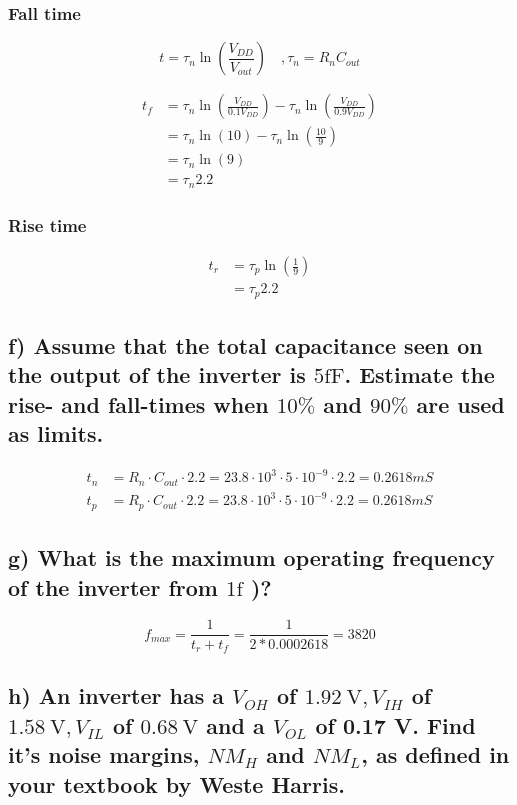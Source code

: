 \subsubsection*{Fall time}
$$t=\tau_n \ln \left(\frac{V_{DD}}{V_{out}}\right)\quad ,\tau_n=R_nC_{out}$$

$$\begin{aligned}
    t_f&=\tau_n \ln \left(\frac{V_{DD}}{0.1V_{DD}}\right)-\tau_n \ln \left(\frac{V_{DD}}{0.9V_{DD}}\right)\\
    &=\tau_n \ln \left(10\right)- \tau_n \ln \left(\frac{10}{9}\right)\\
    &=\tau_n \ln\left(9\right)\\
    &= \tau_n 2.2
\end{aligned}$$

\subsubsection*{Rise time}
$$
\begin{aligned}
    t_r&=\tau_p \ln\left(\frac{1}{9}\right)\\
    &=\tau_p 2.2
\end{aligned}
$$

\subsection*{f) Assume that the total capacitance seen on the output of the inverter is $5 \mathrm{fF}$. Estimate the rise- and fall-times when $10 \%$ and $90 \%$ are used as limits.}
$$\begin{aligned}
    t_n&=R_n\cdot C_{out}\cdot2.2=23.8\cdot 10^{3}\cdot5\cdot10^{-9}\cdot2.2=0.2618m S\\
    t_p&=R_p\cdot C_{out}\cdot2.2=23.8\cdot 10^{3}\cdot5\cdot10^{-9}\cdot2.2=0.2618m S
\end{aligned}$$


\subsection*{g) What is the maximum operating frequency of the inverter from $1 \mathrm{f}$ )?}

$$f_{max}=\frac{1}{t_r+t_f}=\frac{1}{2*0.0002618}=3820$$

\subsection*{h) An inverter has a $V_{O H}$ of $1.92 \mathrm{~V}, V_{I H}$ of $1.58 \mathrm{~V}, V_{I L}$ of $0.68 \mathrm{~V}$ and a $V_{O L}$ of 0.17 V. Find it's noise margins, $N M_H$ and $N M_L$, as defined in your textbook by Weste Harris.}

